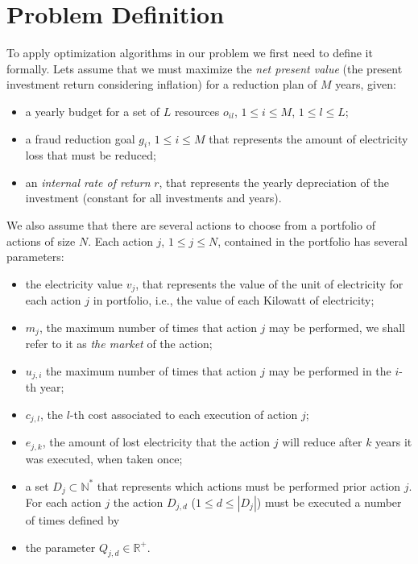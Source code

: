 \section{Problem Definition}
\label{sec:defi} 


To apply optimization algorithms in our problem we first need to define it formally. Lets assume
that we must maximize the \textit{net present value} (the present investment return considering 
inflation) for a reduction plan of $M$ years, given:

\begin{itemize}
    \item a yearly budget for a set of $L$ resources $o_{il}$, $1 \le i \le M$, $1 \le l \le L$;
    
    \item a fraud reduction goal $g_i$, $1 \le i \le M$ that represents the
    amount of electricity loss that must be reduced;

    \item an \textit{internal rate of return} $r$, that represents the yearly depreciation of the investment
    (constant for all investments and years). 

\end{itemize}

We also assume that there are several actions to choose from a portfolio of actions of size $N$.
Each action $j$, $1 \le j \le N$, contained in the portfolio has several parameters: 
\begin{itemize}
    \item the electricity value $v_j$, that represents the value of the unit of electricity for each action $j$ in portfolio,
    i.e., the value of each Kilowatt of electricity;
    \item $m_j$, the maximum number of times that action $j$ may be performed, we
    shall refer to it as \textit{the market} of the action;
    \item $u_{j,i}$ the maximum number of times that action $j$ may be performed in the $i$-th year;
    \item $c_{j,l}$, the $l$-th cost associated to each execution of action $j$;
    \item $e_{j,k}$, the amount of lost electricity that the action $j$ will reduce after 
    $k$ years it was executed, when taken once;
    \item a set $D_j \subset \mathbb{N^*}$ that represents which actions must be performed prior action $j$.
    For each action $j$ the action $D_{j,d}$ ($1 \le d \le |D_j|$) must be executed a number of times defined by
    \item the parameter $Q_{j,d} \in \mathbb{R^+}$.
\end{itemize}

